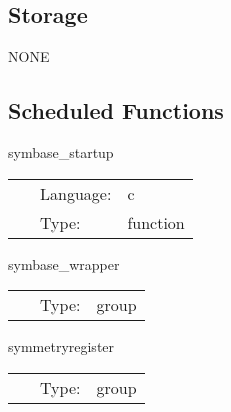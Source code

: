 \subsection*{Storage}NONE
\subsection*{Scheduled Functions}
\vspace{5mm}


\hspace{5mm} symbase\_startup 

\hspace{5mm}{\it register gh extension for symbase } 


\hspace{5mm}

 \begin{tabular*}{160mm}{cll} 
~ & Language:  & c \\ 
~ & Type:  & function \\ 
\end{tabular*} 


\vspace{5mm}


\hspace{5mm} symbase\_wrapper 

\hspace{5mm}{\it wrapper group for symbase } 


\hspace{5mm}

 \begin{tabular*}{160mm}{cll} 
~ & Type:  & group \\ 
\end{tabular*} 


\vspace{5mm}


\hspace{5mm} symmetryregister 

\hspace{5mm}{\it register your symmetries here } 


\hspace{5mm}

 \begin{tabular*}{160mm}{cll} 
~ & Type:  & group \\ 
\end{tabular*} 


